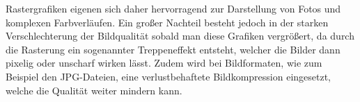 Rastergrafiken eigenen sich daher hervorragend zur Darstellung von Fotos und komplexen Farbverläufen. Ein großer Nachteil besteht jedoch in der starken Verschlechterung der Bildqualität sobald man diese Grafiken vergrößert, da durch die Rasterung ein sogenannter Treppeneffekt entsteht, welcher die Bilder dann pixelig oder unscharf wirken lässt. Zudem wird bei Bildformaten, wie zum Beispiel den JPG-Dateien, eine verlustbehaftete Bildkompression eingesetzt, welche die Qualität weiter mindern kann.